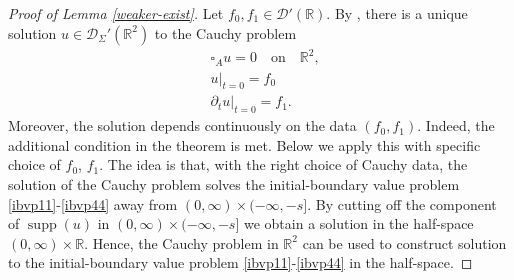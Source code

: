 \documentclass[10pt,a4paper]{article}
\theoremstyle{plain}
\theoremstyle{definition}
\theoremstyle{remark}
\numberwithin{equation}{section}
\newcommand{\R}{\mathbb{R}}
\newcommand{\supp}{\operatorname{supp}}
\begin{document}
\begin{proof}[Proof of Lemma \ref{weaker-exist}]
 Let $f_0,f_1 \in \mathcal{D}'(\R)$.
By  \cite[Th. 5.1.6.]{duistermaat-FIOs}, there is a unique solution $u \in \mathcal{D}_\Sigma' (\R^2)$ to the Cauchy problem 
\begin{align}
&\square_A u = 0 \quad \text{on} \quad \R^2, \\
& u|_{t=0}  = f_0 \\
&\partial_t u |_{t=0} = f_1.
\end{align} 
Moreover, the solution depends continuously on the data $(f_0,f_1)$. Indeed, the additional condition \cite[(5.1.10)]{duistermaat-FIOs} in the theorem is met.  
{Below we apply this
with specific choice of $f_0$, $f_1$. The idea is that, with the right choice of Cauchy data, the solution of the  Cauchy problem solves the initial-boundary value problem \eqref{ibvp11}-\eqref{ibvp44} away from $(0,\infty)\times (-\infty,-s]$. By cutting off the component of  $\supp (u)$ in  $(0,\infty)\times (-\infty,-s]$ we obtain a solution in the half-space $(0,\infty)\times \R$. Hence, the Cauchy problem in $\R^2$ can be used to construct solution to the initial-boundary value problem \eqref{ibvp11}-\eqref{ibvp44} in the half-space.}


\end{proof}
\end{document}
